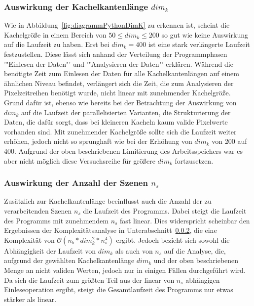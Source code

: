 \subsubsection{Auswirkung der Kachelkantenlänge $dim_k$}
Wie in Abbildung~\ref{fig:diagrammPythonDimK} zu erkennen ist, scheint die Kachelgröße in einem Bereich von $50 \leq dim_k \leq 200$ so gut wie keine Auswirkung auf die Laufzeit zu haben. Erst bei $dim_k = 400$ ist eine stark verlängerte Laufzeit festzustellen. Diese lässt sich anhand der Verteilung der Programmphasen '"Einlesen der Daten"' und '"Analysieren der Daten"' erklären. Während die benötigte Zeit zum Einlesen der Daten für alle Kachelkantenlängen auf einem ähnlichen Niveau befindet, verlängert sich die Zeit, die zum Analysieren der Pixelzeitreihen benötigt wurde, nicht linear mit zunehmender Kachelgröße. Grund dafür ist, ebenso wie bereits bei der Betrachtung der Auswirkung von $dim_k$ auf die Laufzeit der parallelisierten Varianten, die Strukturierung der Daten, die dafür sorgt, dass bei kleineren Kacheln kaum valide Pixelwerte vorhanden sind. Mit zunehmender Kachelgröße sollte sich die Laufzeit weiter erhöhen, jedoch nicht so sprunghaft wie bei der Erhöhung von $dim_k$ von 200 auf 400. Aufgrund der oben beschriebenen Limitierung des Arbeitsspeichers war es aber nicht möglich diese Versuchsreihe für größere $dim_k$ fortzusetzen.

\subsubsection{Auswirkung der Anzahl der Szenen $n_s$}
Zusätzlich zur Kachelkantenlänge beeinflusst auch die Anzahl der zu verarbeitenden Szenen $n_s$ die Laufzeit des Programms. Dabei steigt die Laufzeit des Programms mit zunehmendem $n_s$ fast linear. Dies widerspricht scheinbar den Ergebnissen der Komplexitätsanalyse in Unterabschnitt~\ref{}, die eine Komplexität von $\mathcal{O}(n_b * dim_k^2 * n_s^4)$ ergibt. Jedoch bezieht sich sowohl die Abhängigkeit der Laufzeit von $dim_k$ als auch von $n_s$ auf die Analyse, die, aufgrund der gewählten Kachelkantenlänge $dim_k$ und der oben beschriebenen Menge an nicht validen Werten, jedoch nur in einigen Fällen durchgeführt wird. Da sich die Laufzeit zum größten Teil aus der linear von $n_s$ abhängigen Einleseoperation ergibt, steigt die Gesamtlaufzeit des Programms nur etwas stärker als linear.

